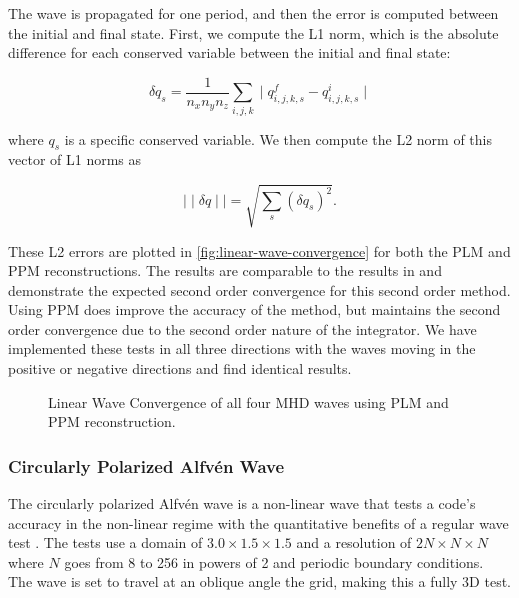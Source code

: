 The wave is propagated for one period, and then the error is computed between the initial and final state. First, we compute the L1 norm, which is the absolute difference for each conserved variable between the initial and final state:

\begin{equation}
    \delta q_s = \frac{1}{n_x n_y n_z} \sum_{i,j,k} \mid q^f_{i,j,k,s} - q^i_{i,j,k,s} \mid
\end{equation}

\noindent where $q_s$ is a specific conserved variable. We then compute the L2 norm of this vector of L1 norms as

\begin{equation}
    \mid \mid \delta q \mid \mid = \sqrt{\sum_s \left( \delta q_s \right)^2}.
\end{equation}

These L2 errors are plotted in \autoref{fig:linear-wave-convergence} for both the PLM and PPM reconstructions. The results are comparable to the results in \cite{stone_2009} and demonstrate the expected second order convergence for this second order method. Using PPM does improve the accuracy of the method, but maintains the second order convergence due to the second order nature of the integrator. We have implemented these tests in all three directions with the waves moving in the positive or negative directions and find identical results.

\begin{figure}[ht!]
    \caption{Linear Wave Convergence of all four MHD waves using PLM and PPM reconstruction. }
    \label{fig:linear-wave-convergence}
\end{figure}

\subsubsection{Circularly Polarized Alfv\'en Wave}
\label{sec:cpaw}

The circularly polarized Alfv\'en wave is a non-linear wave that tests a code's accuracy in the non-linear regime with the quantitative benefits of a regular wave test \citep{Toth1996}. The tests use a domain of $3.0\times1.5\times1.5$ and a resolution of $2N\times N \times N$ where $N$ goes from 8 to 256 in powers of 2 and periodic boundary conditions. The wave is set to travel at an oblique angle the grid, making this a fully 3D test.

